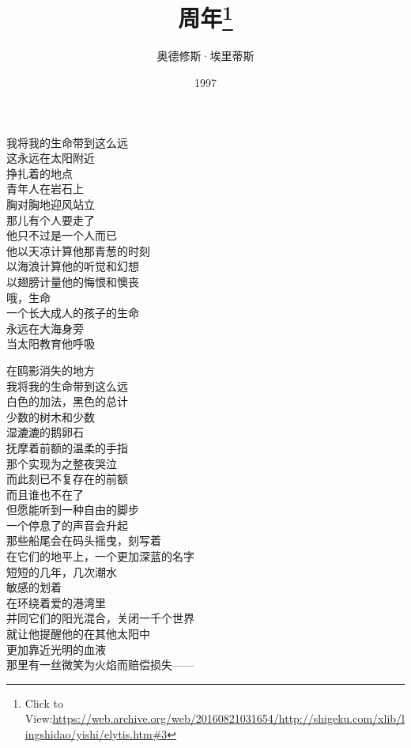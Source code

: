 \documentclass{article}
\title{周年\footnote{Click to View:\url{https://web.archive.org/web/20160821031654/http://shigeku.com/xlib/lingshidao/yishi/elytis.htm#3}}}
\author{奥德修斯·埃里蒂斯}
\date{1997}
\begin{document}

\maketitle

\setlength\parindent{0pt}


\Large

﻿我将我的生命带到这么远\\
这永远在太阳附近\\
挣扎着的地点\\
青年人在岩石上\\
胸对胸地迎风站立\\
那儿有个人要走了\\
他只不过是一个人而已\\
他以天凉计算他那青葱的时刻\\
以海浪计算他的听觉和幻想\\
以翅膀计量他的悔恨和懊丧\\
哦，生命\\
一个长大成人的孩子的生命\\
永远在大海身旁\\
当太阳教育他呼吸
\\
\newpage

在鸥影消失的地方 \\ 


我将我的生命带到这么远\\
白色的加法，黑色的总计\\
少数的树木和少数\\
湿漉漉的鹅卵石\\
抚摩着前额的温柔的手指\\
那个实现为之整夜哭泣\\
而此刻已不复存在的前额\\
而且谁也不在了\\
但愿能听到一种自由的脚步\\
一个停息了的声音会升起\\
那些船尾会在码头摇曳，刻写着\\
在它们的地平上，一个更加深蓝的名字\\
短短的几年，几次潮水\\
敏感的划着
\\
在环绕着爱的港湾里 \\ 


并同它们的阳光混合，关闭一千个世界\\
就让他提醒他的在其他太阳中\\
更加靠近光明的血液\\
那里有一丝微笑为火焰而赔偿损失——\\
\newpage
\end{document}
